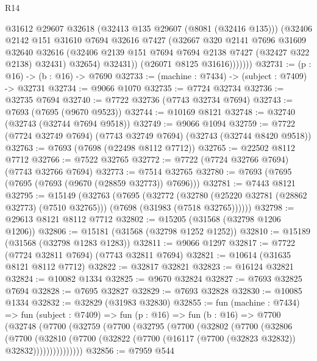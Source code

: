 \begin{lexlean}{R14}
\begin{coremodule}
                  @31612
                  @29607
                  @32618
                  (@32413 @135 @29607 (@8081 (@32416 @135)))
                  (@32406
                    @2142
                    @151
                    @31610
                    @7694
                    @32616
                    @7427
                    (@32667
                      @320
                      @2141
                      @7696
                      @31609
                      @32640
                      @32616
                      (@32406 @2139 @151 @7694 @7694 @2138 @7427 (@32427 @322 @2138) @32431)
                      @32654)
                    @32431))
                (@26071 @8125 @31616)))))))
@32731 := (p : @16) -> (b : @16) -> @7690
@32733 := (machine : @7434) -> (subject : @7409) -> @32731
@32734 := @9066 @1070
@32735 := @7724 @32734
@32736 := @32735 @7694
@32740 := @7722 @32736 (@7743 @32734 @7694)
@32743 := @7693 (@7695 (@9670 @9523))
@32744 := @10169 @8121
@32748 := @32740 (@32743 (@32744 @7694 @9518))
@32749 := @9066 @1094
@32759 := @7722 (@7724 @32749 @7694) (@7743 @32749 @7694) (@32743 (@32744 @8420 @9518))
@32763 := @7693 (@7698 (@22498 @8112 @7712))
@32765 := @22502 @8112 @7712
@32766 := @7522 @32765
@32772 := @7722 (@7724 @32766 @7694) (@7743 @32766 @7694)
@32773 := @7514 @32765
@32780 := @7693 (@7695 (@7695 (@7693 (@9670 (@28859 @32773)) @7696)))
@32781 := @7443 @8121
@32795 := @15149
    (@32763
      (@7695
        (@32772
          (@32780 (@25220 @32781 (@28862 @32773) (@7510 @32765)))
          (@7698 (@31983 (@7518 @32765))))))
@32798 := @29613 @8121 @8112 @7712
@32802 := @15205 (@31568 (@32798 @1206 @1206))
@32806 := @15181 (@31568 (@32798 @1252 @1252))
@32810 := @15189 (@31568 (@32798 @1283 @1283))
@32811 := @9066 @1297
@32817 := @7722 (@7724 @32811 @7694) (@7743 @32811 @7694)
@32821 := @10614 (@31635 @8121 @8112 @7712)
@32822 := @32817 @32821
@32823 := @16124 @32821
@32824 := @10082 @1334
@32825 := @9670 @32824
@32827 := @7693 @32825 @7694
@32828 := @7695 @32827
@32829 := @7693 @32828
@32830 := @10085 @1334
@32832 := @32829 (@31983 @32830)
@32855 := fun (machine : @7434) =>
  fun (subject : @7409) =>
  fun (p : @16) =>
  fun (b : @16) =>
  @7700
    (@32748
      (@7700
        (@32759
          (@7700
            (@32795
              (@7700
                (@32802
                  (@7700
                    (@32806
                      (@7700
                        (@32810
                          (@7700
                            (@32822 (@7700 (@16117 (@7700 (@32823 @32832)) @32832)))))))))))))))
@32856 := @7959 @544

\end{coremodule}
\end{lexlean}
